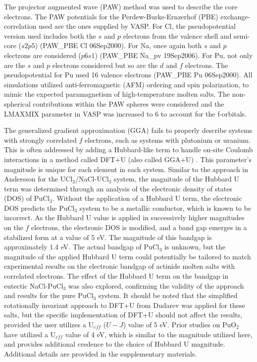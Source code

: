 \documentclass[review]{elsarticle}
\begin{document}
The projector augmented wave (PAW) method was used to describe the core electrons\cite{Kresse1996a,kresse1999ultrasoft}. The PAW potentials for the Perdew-Burke-Ernzerhof (PBE) \cite{perdew1996} exchange-correlation used are the ones supplied by VASP. For Cl, the pseudopotential version used includes both the $s$ and $p$ electrons from the valence shell and semi-core ($s2p5$) (PAW\_PBE Cl 06Sep2000). For Na, once again both $s$ and $p$ electrons are considered ($p6s1$) (PAW\_PBE Na\_pv 19Sep2006). For Pu, not only are the $s$ and $p$ electrons considered but so are the $d$ and $f$ electrons. The pseudopotential for Pu used 16 valence electrons (PAW\_PBE Pu 06Sep2000). All simulations utilized anti-ferromagnetic (AFM) ordering and spin polarization, to mimic the expected paramagnetism of high-temperature molten salts. The non-spherical contributions within the PAW spheres were considered and the LMAXMIX parameter in VASP was increased to 6 to account for the f-orbitals.

The generalized gradient approximation (GGA) fails to properly describe systems with strongly correlated $f$ electrons, such as systems with plutonium or uranium. This is often addressed by adding a Hubbard-like term to handle on-site Coulomb interactions in a method called DFT+U (also called GGA+U) \cite{rohrbach2003electronic}. This parameter's magnitude is unique for each element in each system. Similar to the approach in Andersson \cite{ANDERSSON2022153836} for the UCl$_3$/NaCl-UCl$_3$ system, the magnitude of the Hubbard U term was determined through an analysis of the electronic density of states (DOS) of PuCl$_3$. Without the application of a Hubbard U term, the electronic DOS predicts the PuCl$_3$ system to be a metallic conductor, which is known to be incorrect. As the Hubbard U value is applied in successively higher magnitudes on the $f$ electrons, the electronic DOS is modified, and a band gap emerges in a stabilized form at a value of 5 eV. The magnitude of this bandgap is approximately 1.4 eV. The actual bandgap of PuCl$_3$ is unknown, but the magnitude of the applied Hubbard U term could potentially be tailored to match experimental results on the electronic bandgap of actinide molten salts with correlated electrons. The effect of the Hubbard U term on the bandgap in eutectic NaCl-PuCl$_3$ was also explored, confirming the validity of the approach and results for the pure PuCl$_3$ system. It should be noted that the simplified rotationally invariant approach to DFT+U from Dudarev \cite{Dudarev1998} was applied for these salts, but the specific implementation of DFT+U should not affect the results, provided the user utilizes a U$_{eff}$ ($U-J$) value of 5 eV. Prior studies on PuO$_2$ \cite{SUN2012} have utilized a U$_{eff}$ value of 4 eV, which is similar to the magnitude utilized here, and provides additional credence to the choice of Hubbard U magnitude. Additional details are provided in the supplementary materials.
\end{document}
